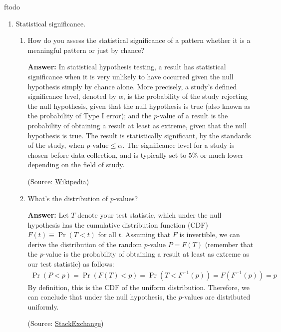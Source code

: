 ƒtodo\documentclass{article}
\newenvironment{QandA}{\begin{enumerate}[label=\arabic*.]}{\end{enumerate}}
\newenvironment{InnerQandA}{\begin{enumerate}[label=\roman*.]}{\end{enumerate}}
\newenvironment{answer}{\par\normalfont \textbf{Answer:}}{}
\begin{document}
\begin{QandA}
    \item Statistical significance.
    \begin{InnerQandA}
        \item How do you assess the statistical significance of a pattern whether it is a meaningful pattern or just by chance? 
        \begin{answer}
             In statistical hypothesis testing, a result has statistical significance when it is very unlikely to have occurred given the null hypothesis simply by chance alone. More precisely, a study's defined significance level, denoted by $\alpha$, is the probability of the study rejecting the null hypothesis, given that the null hypothesis is true (also known as the probability of Type I error); and the $p$-value of a result is the probability of obtaining a result at least as extreme, given that the null hypothesis is true. The result is statistically significant, by the standards of the study, when $p\text{-value} \le \alpha$. The significance level for a study is chosen before data collection, and is typically set to $5\%$ or much lower -- depending on the field of study. 
             
             (Source: \href{https://en.wikipedia.org/wiki/Statistical_significance}{Wikipedia})
        \end{answer}
        
        \item What’s the distribution of $p$-values?
        \begin{answer}
            Let $T$ denote your test statistic, which under the null hypothesis has the cumulative distribution function (CDF) $F(t) \equiv \Pr (T < t)$ for all $t$. Assuming that $F$ is invertible, we can derive the distribution of the random $p$-value $P = F(T)$ (remember that the $p$-value is the probability of obtaining a result at least as extreme as our test statistic) as follows:
            \begin{align*}
                \Pr (P < p) = \Pr (F(T) < p) = \Pr (T < F^{-1}(p)) = F(F^{-1}(p)) = p
            \end{align*}
            By definition, this is the CDF of the uniform distribution. Therefore, we can conclude that under the null hypothesis, the $p$-values are distributed uniformly. 
            
            (Source: \href{https://stats.stackexchange.com/a/345763}{StackExchange})
        \end{answer}


\end{InnerQandA}
\end{QandA}
\end{document}
